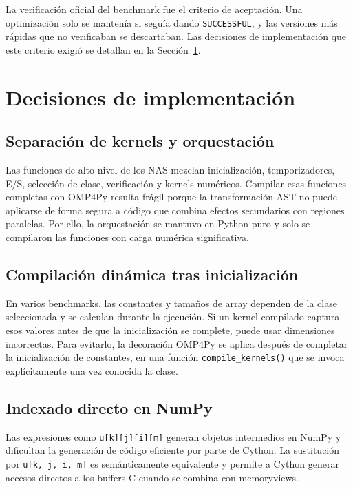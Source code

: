 La verificación oficial del benchmark fue el criterio de aceptación. Una
optimización solo se mantenía si seguía dando \texttt{SUCCESSFUL}, y las
versiones más rápidas que no verificaban se descartaban. Las decisiones de
implementación que este criterio exigió se detallan en la
Sección~\ref{sec:decisiones-implementacion}.


\section{Decisiones de implementación}
\label{sec:decisiones-implementacion}

\subsection{Separación de kernels y orquestación}
Las funciones de alto nivel de los NAS mezclan inicialización, temporizadores,
E/S, selección de clase, verificación y kernels numéricos. Compilar esas
funciones completas con OMP4Py resulta frágil porque la transformación AST no
puede aplicarse de forma segura a código que combina efectos secundarios con
regiones paralelas. Por ello, la orquestación se mantuvo en Python puro y solo
se compilaron las funciones con carga numérica significativa.

\subsection{Compilación dinámica tras inicialización}
En varios benchmarks, las constantes y tamaños de array dependen de la clase
seleccionada y se calculan durante la ejecución. Si un kernel compilado captura
esos valores antes de que la inicialización se complete, puede usar dimensiones
incorrectas. Para evitarlo, la decoración OMP4Py se aplica después de completar
la inicialización de constantes, en una función \texttt{compile\_kernels()} que
se invoca explícitamente una vez conocida la clase.

\subsection{Indexado directo en NumPy}
Las expresiones como \texttt{u[k][j][i][m]} generan objetos intermedios en
NumPy y dificultan la generación de código eficiente por parte de Cython. La
sustitución por \texttt{u[k, j, i, m]} es semánticamente equivalente y permite
a Cython generar accesos directos a los buffers C cuando se combina con
memoryviews.

